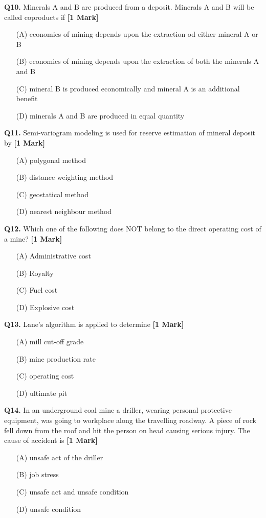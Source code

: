 \documentclass[11pt]{article}
\newcommand{\questiona}[2]{
    \noindent\textbf{Q#2.} #1 \hfill \textbf{[1 Mark]}
}
\begin{document}
\questiona{Minerals A and B are produced from a deposit. Minerals A and B will be called coproducts if}{10}
\begin{enumerate}
    \item[(A)] economies of mining depends upon the extraction od either mineral A or B  
    \item[(B)] economics of mining depends upon the extraction of both the minerals A and B  
    \item[(C)] mineral B is produced economically and mineral A is an additional benefit  
    \item[(D)] minerals A and B are produced in equal quantity 
\end{enumerate}
\vspace{0.5cm}

\questiona{Semi-variogram modeling is used for reserve estimation of mineral deposit by}{11}
\begin{enumerate}
    \item[(A)] polygonal method  
    \item[(B)] distance weighting method  
    \item[(C)] geostatical method  
    \item[(D)] nearest neighbour method  
\end{enumerate}
\vspace{0.5cm}

\questiona{Which one of the following does NOT belong to the direct operating cost of a mine?}{12}
\begin{enumerate}
    \item[(A)] Administrative cost  
    \item[(B)] Royalty  
    \item[(C)] Fuel cost  
    \item[(D)] Explosive cost  
\end{enumerate}
\vspace{0.5cm}

\questiona{Lane's algorithm is applied to determine}{13}
\begin{enumerate}
    \item[(A)] mill cut-off grade  
    \item[(B)] mine production rate  
    \item[(C)] operating cost  
    \item[(D)] ultimate pit  
\end{enumerate}
\vspace{0.5cm}

\questiona{In an underground coal mine a driller, wearing personal protective equipment, was going to workplace along the travelling roadway. A piece of rock fell down from the roof and hit the person on head causing serious injury. The cause of accident is}{14}
\begin{enumerate}
    \item[(A)] unsafe act of the driller  
    \item[(B)] job stress  
    \item[(C)] unsafe act and unsafe condition  
    \item[(D)] unsafe condition  
\end{enumerate}
\vspace{0.5cm}
\end{document}

